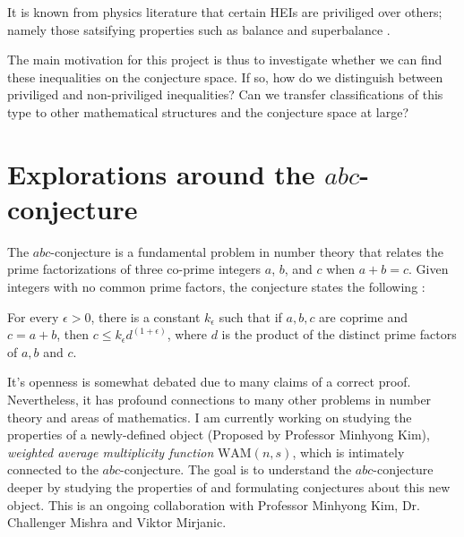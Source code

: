It is known from physics literature that certain HEIs are priviliged over others; namely those satsifying properties such as balance and superbalance \cite{heSuperbalanceHolographicEntropy2020}.
\par The main motivation for this project is thus to investigate whether we can find these inequalities on the conjecture space. If so, how do we distinguish between priviliged and non-priviliged inequalities? Can we transfer classifications of this type to other mathematical structures and the conjecture space at large?

\section{Explorations around the \texorpdfstring{$abc$}{abc}-conjecture}
\label{sec:abc-conjecture}
The $abc$-conjecture is a fundamental problem in number theory that relates the prime factorizations of three co-prime integers $a$, $b$, and $c$ when $a + b = c$. Given integers with no common prime factors, the conjecture states the following \cite{masser1985open}:
\begin{conjecture}
    \label{abc}
    For every $\epsilon > 0$, there is a constant $k_\epsilon$ such that if $a,b,c$ are coprime and $c = a + b$, then $c\leq k_\epsilon d^{(1 + \epsilon)}$, where $d$ is the product of the distinct prime factors of $a, b$ and $c$.
\end{conjecture}
It's openness is somewhat debated due to many claims of a correct proof. Nevertheless, it has profound connections to many other problems in number theory and areas of mathematics. I am currently working on studying the properties of a newly-defined object (Proposed by Professor Minhyong Kim), \emph{weighted average multiplicity function} $\text{WAM}(n, s)$,
which is intimately connected to the $abc$-conjecture. The goal is to understand the $abc$-conjecture deeper by studying the properties of and formulating conjectures about this new object. This is an ongoing collaboration with Professor Minhyong Kim, Dr. Challenger Mishra and Viktor Mirjanic.

